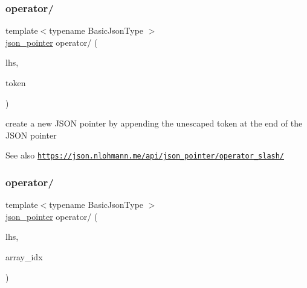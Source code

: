 \subsubsection{\texorpdfstring{operator/}{operator/}\hspace{0.1cm}{\footnotesize\ttfamily [2/3]}}
{\footnotesize\ttfamily template$<$typename Basic\+Json\+Type $>$ \\
\hyperlink{classnlohmann_1_1json__pointer}{json\+\_\+pointer} operator/ (\begin{DoxyParamCaption}\item[{const \hyperlink{classnlohmann_1_1json__pointer}{json\+\_\+pointer}$<$ Basic\+Json\+Type $>$ \&}]{lhs,  }\item[{std\+::string}]{token }\end{DoxyParamCaption})\hspace{0.3cm}{\ttfamily [friend]}}



create a new J\+S\+ON pointer by appending the unescaped token at the end of the J\+S\+ON pointer 

\begin{DoxySeeAlso}{See also}
\href{https://json.nlohmann.me/api/json_pointer/operator_slash/}{\tt https\+://json.\+nlohmann.\+me/api/json\+\_\+pointer/operator\+\_\+slash/} 
\end{DoxySeeAlso}
\mbox{\label{classnlohmann_1_1json__pointer_a29f6d4b492e784b9d196b05a4048c289}} 
\subsubsection{\texorpdfstring{operator/}{operator/}\hspace{0.1cm}{\footnotesize\ttfamily [3/3]}}
{\footnotesize\ttfamily template$<$typename Basic\+Json\+Type $>$ \\
\hyperlink{classnlohmann_1_1json__pointer}{json\+\_\+pointer} operator/ (\begin{DoxyParamCaption}\item[{const \hyperlink{classnlohmann_1_1json__pointer}{json\+\_\+pointer}$<$ Basic\+Json\+Type $>$ \&}]{lhs,  }\item[{std\+::size\+\_\+t}]{array\+\_\+idx }\end{DoxyParamCaption})\hspace{0.3cm}{\ttfamily [friend]}}



